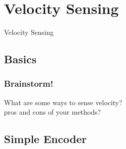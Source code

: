 \documentclass{beamer}
\begin{document}
\begin{frame}
\titlepage

\setcounter{tocdepth}{1}
\tableofcontents
\end{frame}

%
%
%


\section{Velocity Sensing} %
\begin{frame}
\centering \huge Velocity Sensing
\end{frame}

\subsection{Basics}

\begin{frame}
\frametitle{Brainstorm!}
\centering
What are some ways to sense velocity? \\
{\tiny pros and cons of your methods?}
\end{frame}

\subsection{Simple Encoder}
\end{document}
